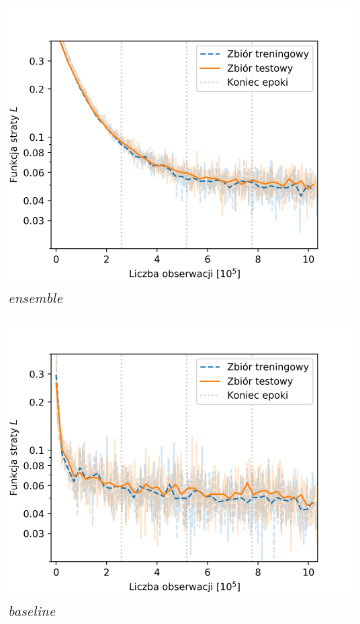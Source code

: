 \documentclass{pracalicmgr}
\begin{document}
	\begin{figure}[H]
	\begin{subfigure}{.5\textwidth}
	\centering
	\includegraphics[width=1\textwidth]{loss_ensemble.png}
	\caption{\textit{ensemble}}
	\end{subfigure}
	\begin{subfigure}{.5\textwidth}
	\centering
	\includegraphics[width=1\textwidth]{loss_baseline.png}
	\caption{\textit{baseline}}
	\end{subfigure}
	\begin{subfigure}{.5\textwidth}
	\centering

\end{subfigure}
\end{figure}
\end{document}
